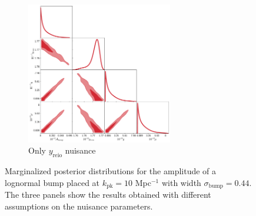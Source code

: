 \begin{figure}
    \begin{subfigure}{0.5\textwidth}
        \centering
        \includegraphics[width=0.7\textwidth]{Constraints/LN_NN_reio.pdf}
        \caption{Only $y_\text{reio}$ nuisance}
        \label{fig:LN_NN_reio}        
    \end{subfigure}
    \caption{Marginalized posterior distributions for the amplitude of a lognormal bump placed at $k_\text{pk}=10$ Mpc$^{-1}$ with width $\sigma_\text{bump}=0.44$. The three panels show the results obtained with different assumptions on the nuisance parameters.}
    \label{fig:LN_all}
\end{figure}


